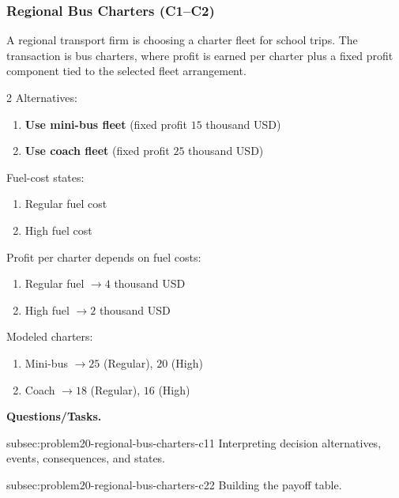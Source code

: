 	\subsubsection{Regional Bus Charters (C1--C2)}
	\label{sec:problem20-regional-bus-charters-c1-c2}
	A regional transport firm is choosing a charter fleet for school trips. The transaction is bus charters, where profit is earned per charter plus a fixed profit component tied to the selected fleet arrangement.

	\begin{multicols}{2}
		Alternatives:
		\begin{enumerate}[label=\arabic*.]
			\item \textbf{Use mini-bus fleet} (fixed profit $15$ thousand USD)
			\item \textbf{Use coach fleet} (fixed profit $25$ thousand USD)
		\end{enumerate}

		Fuel-cost states:
		\begin{enumerate}[label=\arabic*.]
			\item Regular fuel cost
			\item High fuel cost
		\end{enumerate}

			\columnbreak

		Profit per charter depends on fuel costs:
		\begin{enumerate}[label=\arabic*.]
			\item Regular fuel $\to 4$ thousand USD
			\item High fuel $\to 2$ thousand USD
		\end{enumerate}

		Modeled charters:
		\begin{enumerate}[label=\arabic*.]
			\item Mini-bus $\to 25$ (Regular), $20$ (High)
			\item Coach $\to 18$ (Regular), $16$ (High)
		\end{enumerate}
	\end{multicols}

	\textbf{Questions/Tasks.}
	\begin{enumerate}
		\CriterionTask
		{subsec:problem20-regional-bus-charters-c1}{1}
		{Interpreting decision alternatives, events, consequences, and states.}

		\CriterionTask
		{subsec:problem20-regional-bus-charters-c2}{2}
		{Building the payoff table.}
	\end{enumerate}

